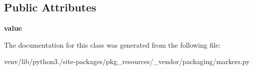 \subsection*{Public Attributes}
\begin{DoxyCompactItemize}
\item 
\mbox{\label{classpkg__resources_1_1__vendor_1_1packaging_1_1markers_1_1_node_a6b179c89dbc2c065efc7fe3adef11bd1}} 
{\bfseries value}
\end{DoxyCompactItemize}


The documentation for this class was generated from the following file\+:\begin{DoxyCompactItemize}
\item 
venv/lib/python3./site-\/packages/pkg\+\_\+resources/\+\_\+vendor/packaging/markers.\+py\end{DoxyCompactItemize}
